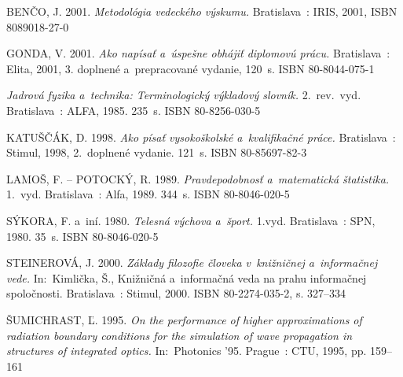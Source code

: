 \begin{thebibliography}{999}
BENČO, J. 2001. \emph{Metodológia vedeckého výskumu.} Bratislava~:
IRIS, 2001, ISBN 80\discretionary{-}{-}{-}89018-27-0

GONDA, V. 2001. \emph{Ako napísať a~úspešne obhájiť diplomovú prácu.}
Bratislava~: Elita, 2001, 3. doplnené a~prepracované vydanie, 120~s.
ISBN 80-8044-075-1

\emph{Jadrová fyzika a~technika: Terminologický výkladový slovník.}
2.~rev.~vyd. Bratislava~: ALFA, 1985. 235~s. ISBN 80-8256-030-5

KATUŠČÁK, D. 1998. \emph{Ako písať vysokoškolské a~kvalifikačné
práce.} Bratislava~: Stimul, 1998, 2.~doplnené vydanie. 121~s. ISBN
80-85697-82-3

LAMOŠ, F. -- POTOCKÝ, R. 1989. \emph{Pravdepodobnosť a~matematická
štatistika.} 1.~vyd. Bratislava~: Alfa, 1989. 344~s. ISBN 80-8046-020-5

SÝKORA, F. a~iní. 1980. \emph{Telesná výchova a~šport.} 1.vyd.
Bratislava~: SPN, 1980. 35~s. ISBN 80-8046-020-5

STEINEROVÁ, J. 2000. \emph{Základy filozofie človeka v~knižničnej
a~informačnej vede.} In:~Kimlička, Š., Knižničná a~informačná veda na
prahu informačnej spoločnosti. Bratislava~: Stimul, 2000. ISBN
80-2274-035-2, s. 327--334

ŠUMICHRAST, Ľ. 1995. \emph{On the performance of higher approximations
of radiation boundary conditions for the simulation of wave propagation
in structures of integrated optics.} In:~Photonics '95. Prague~: CTU,
1995, pp. 159--161
\end{thebibliography}